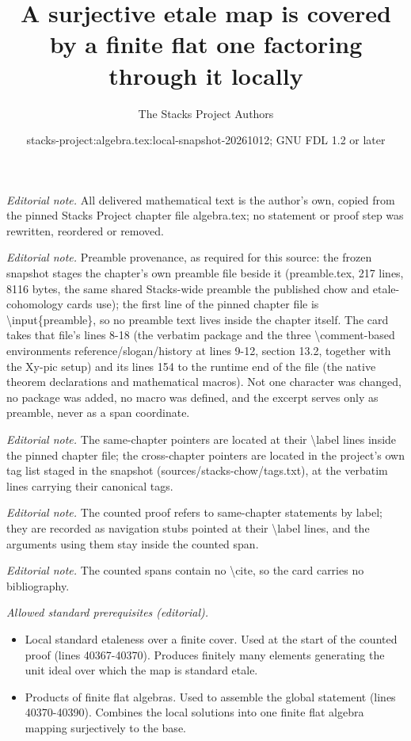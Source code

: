 \documentclass[10pt,a4paper]{amsart}
\title{A surjective etale map is covered by a finite flat one factoring through it locally}
\author{The Stacks Project Authors}
\date{stacks-project:algebra.tex:local-snapshot-20261012; GNU FDL 1.2 or later}
\theoremstyle{plain}
\theoremstyle{definition}
\theoremstyle{remark}
\numberwithin{equation}{subsection}
\begin{document}
\maketitle
\noindent\textit{Editorial note.} All delivered mathematical text is the author's own, copied from the pinned Stacks Project chapter file algebra.tex; no statement or proof step was rewritten, reordered or removed.\par\medskip
\noindent\textit{Editorial note.} Preamble provenance, as required for this source: the frozen snapshot stages the chapter's own preamble file beside it (preamble.tex, 217 lines, 8116 bytes, the same shared Stacks-wide preamble the published chow and etale-cohomology cards use); the first line of the pinned chapter file is \textbackslash{}input\{preamble\}, so no preamble text lives inside the chapter itself. The card takes that file's lines 8-18 (the verbatim package and the three \textbackslash{}comment-based environments reference/slogan/history at lines 9-12, section 13.2, together with the Xy-pic setup) and its lines 154 to the runtime end of the file (the native theorem declarations and mathematical macros). Not one character was changed, no package was added, no macro was defined, and the excerpt serves only as preamble, never as a span coordinate.\par\medskip
\noindent\textit{Editorial note.} The same-chapter pointers are located at their \textbackslash{}label lines inside the pinned chapter file; the cross-chapter pointers are located in the project's own tag list staged in the snapshot (sources/stacks-chow/tags.txt), at the verbatim lines carrying their canonical tags.\par\medskip
\noindent\textit{Editorial note.} The counted proof refers to same-chapter statements by label; they are recorded as navigation stubs pointed at their \textbackslash{}label lines, and the arguments using them stay inside the counted span.\par\medskip
\noindent\textit{Editorial note.} The counted spans contain no \textbackslash{}cite, so the card carries no bibliography.\par\medskip
\noindent\textit{Allowed standard prerequisites (editorial).}\begin{itemize}
\item Local standard etaleness over a finite cover. Used at the start of the counted proof (lines 40367-40370). Produces finitely many elements generating the unit ideal over which the map is standard etale.
\item Products of finite flat algebras. Used to assemble the global statement (lines 40370-40390). Combines the local solutions into one finite flat algebra mapping surjectively to the base.
\end{itemize}\medskip
\end{document}
